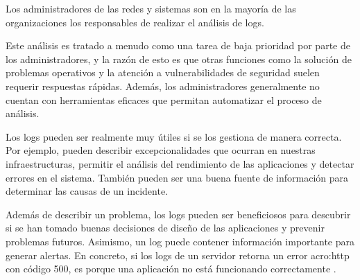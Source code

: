 Los administradores de las redes y sistemas son en la mayoría de las
organizaciones los responsables de realizar el análisis de logs.

Este análisis es tratado a menudo como una tarea de baja prioridad por parte de
los administradores, y la razón de esto es que otras funciones como la solución
de problemas operativos y la atención a vulnerabilidades de seguridad suelen
requerir respuestas rápidas. Además, los administradores generalmente no
cuentan con herramientas eficaces que permitan automatizar el proceso de
análisis.

Los logs pueden ser realmente muy útiles si se los gestiona de manera correcta.
Por ejemplo, pueden describir excepcionalidades que ocurran en nuestras
infraestructuras, permitir el análisis del rendimiento de las aplicaciones y
detectar errores en el sistema. También pueden ser una buena fuente de
información para determinar las causas de un incidente.

Además de describir un problema, los logs pueden ser beneficiosos para
descubrir si se han tomado buenas decisiones de diseño de las aplicaciones y
prevenir problemas futuros. Asimismo, un log puede contener información
importante para generar alertas. En concreto, si los logs de un servidor
 retorna un error \gls{acro:http} con código 500, es porque una
aplicación no está funcionando correctamente
\cite[p.~30-31]{monitoreo:logging_and_log_management}.

